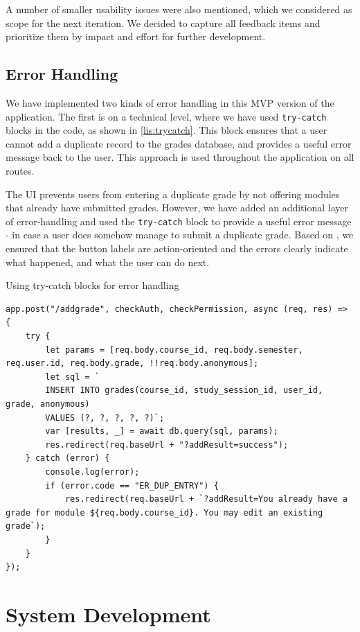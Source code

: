 A number of smaller usability issues were also mentioned, which we considered as scope for the next iteration. We decided to capture all feedback items and prioritize them by impact and effort for further development.

\subsection{Error Handling}
We have implemented two kinds of error handling in this MVP version of the application. The first is on a technical level, where we have used \texttt{try-catch} blocks in the code, as shown in \cref{lis:trycatch}. This block ensures that a user cannot add a duplicate record to the grades database, and provides a useful error message back to the user. This approach is used throughout the application on all routes.

The UI prevents users from entering a duplicate grade by not offering modules that already have submitted grades. However, we have added an additional layer of error-handling and used the \texttt{try-catch} block to provide a useful error message - in case a user does somehow manage to submit a duplicate grade. Based on \cite{mckay_2013}, we ensured that the button labels are action-oriented and the errors clearly indicate what happened, and what the user can do next.

\begin{listing}[H]
	\caption{Using try-catch blocks for error handling}
	\label{lis:trycatch}
	\begin{verbatim}
app.post("/addgrade", checkAuth, checkPermission, async (req, res) => {
	try {
		let params = [req.body.course_id, req.body.semester, req.user.id, req.body.grade, !!req.body.anonymous];
		let sql = `
		INSERT INTO grades(course_id, study_session_id, user_id, grade, anonymous)
		VALUES (?, ?, ?, ?, ?)`;
		var [results, _] = await db.query(sql, params);
		res.redirect(req.baseUrl + "?addResult=success");
	} catch (error) {
		console.log(error);
		if (error.code == "ER_DUP_ENTRY") {
			res.redirect(req.baseUrl + `?addResult=You already have a grade for module ${req.body.course_id}. You may edit an existing grade`);
		}
	}
});
	\end{verbatim}
\end{listing}


\section{System Development}

